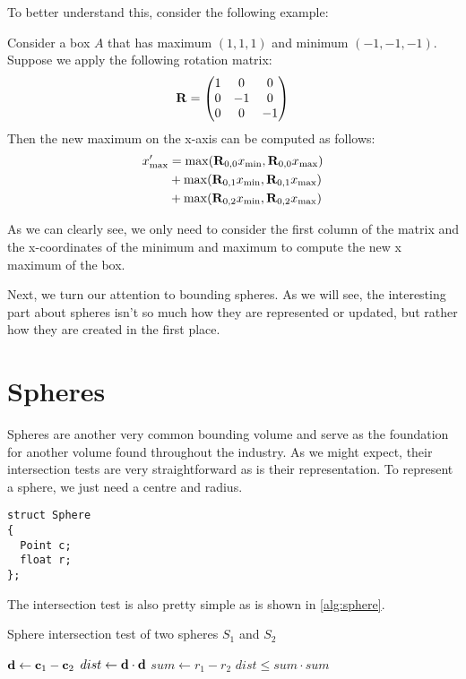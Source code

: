     To better understand this, consider the following example:
    \begin{exmp}
      Consider a box $A$ that has maximum $(1, 1, 1)$ and minimum $(-1, -1,
      -1)$. Suppose we apply the following rotation matrix: 
      \[
        {\mathbf R} = 
        \begin{pmatrix}
          1 & 0 & 0 \\
          0 & -1 & 0 \\
          0 & 0 & -1
        \end{pmatrix}
      \]
      Then the new maximum on the x-axis can be computed as follows:
      \begin{align*}
        x'_{\max} &= \max({\mathbf R}_{0, 0}x_{\min}, {\mathbf R}_{0, 0}x_{\max}) \\
                  &+ \max({\mathbf R}_{0, 1}x_{\min}, {\mathbf R}_{0, 1}x_{\max}) \\ 
                  &+ \max({\mathbf R}_{0, 2}x_{\min}, {\mathbf R}_{0, 2}x_{\max}) \\ 
      \end{align*}
    \end{exmp}

    As we can clearly see, we only need to consider the first column of the
    matrix and the x-coordinates of the minimum and maximum to compute the new
    x maximum of the box.

    Next, we turn our attention to bounding spheres. As we will see, the
    interesting part about spheres isn't so much how they are represented or
    updated, but rather how they are created in the first place.

  \section{Spheres}
    Spheres are another very common bounding volume and serve as the foundation
    for another volume found throughout the industry. As we might expect, their
    intersection tests are very straightforward as is their representation. To
    represent a sphere, we just need a centre and radius.
    \begin{lstlisting}[caption=Sphere representation, style=codestyle]
struct Sphere
{
  Point c;
  float r;
};
    \end{lstlisting}

    The intersection test is also pretty simple as is shown in \ref{alg:sphere}.
    \begin{algorithm}
      \caption{Sphere intersection test of two spheres $S_1$ and $S_2$}
      \label{alg:sphere}
      \begin{algorithmic}
        \State ${\mathbf d } \gets {\mathbf c }_1 - {\mathbf c }_2$
        \State $dist \gets {\mathbf d } \cdot {\mathbf d }$
        \State $sum \gets r_1 - r_2$
        \State \Return $dist \leq sum \cdot sum$
      \end{algorithmic}
    \end{algorithm}

